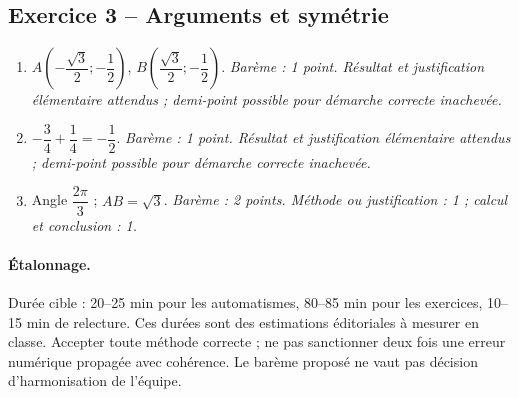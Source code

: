 \subsection*{Exercice 3 -- Arguments et symétrie}
\begin{enumerate}
\item $A(-\dfrac{\sqrt 3}{2};-\dfrac{1}{2})$, $B(\dfrac{\sqrt 3}{2};-\dfrac{1}{2})$. \textit{Barème : 1 point. Résultat et justification élémentaire attendus ; demi-point possible pour démarche correcte inachevée.}
\item $-\dfrac{3}{4}+\dfrac{1}{4}=-\dfrac{1}{2}$. \textit{Barème : 1 point. Résultat et justification élémentaire attendus ; demi-point possible pour démarche correcte inachevée.}
\item Angle $\dfrac{2\pi}{3}$ ; $AB=\sqrt3$. \textit{Barème : 2 points. Méthode ou justification : 1 ; calcul et conclusion : 1.}
\end{enumerate}
\paragraph{Étalonnage.} Durée cible : 20–25 min pour les automatismes, 80–85 min pour les exercices, 10–15 min de relecture. Ces durées sont des estimations éditoriales à mesurer en classe. Accepter toute méthode correcte ; ne pas sanctionner deux fois une erreur numérique propagée avec cohérence. Le barème proposé ne vaut pas décision d’harmonisation de l’équipe.
